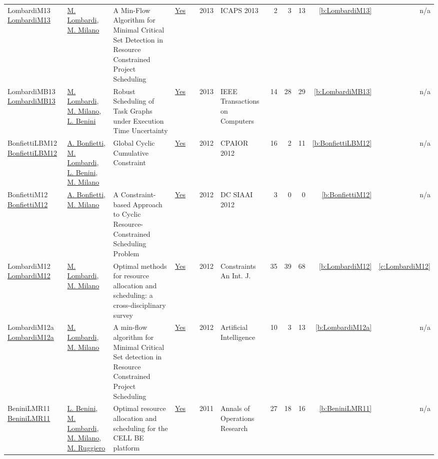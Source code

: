 {\begin{longtable}{>{\raggedright\arraybackslash}p{3cm}>{\raggedright\arraybackslash}p{6cm}>{\raggedright\arraybackslash}p{6.5cm}rrrp{2.5cm}rrrrr}
LombardiM13 \href{http://www.aaai.org/ocs/index.php/ICAPS/ICAPS13/paper/view/6052}{LombardiM13} & \hyperref[auth:a143]{M. Lombardi}, \hyperref[auth:a144]{M. Milano} & A Min-Flow Algorithm for Minimal Critical Set Detection in Resource Constrained Project Scheduling & \href{../works/LombardiM13.pdf}{Yes} & \cite{LombardiM13} & 2013 & ICAPS 2013 & 2 & 3 & 13 & \ref{b:LombardiM13} & n/a\\
LombardiMB13 \href{http://dx.doi.org/10.1109/tc.2011.203}{LombardiMB13} & \hyperref[auth:a143]{M. Lombardi}, \hyperref[auth:a144]{M. Milano}, \hyperref[auth:a247]{L. Benini} & Robust Scheduling of Task Graphs under Execution Time Uncertainty & \href{../works/LombardiMB13.pdf}{Yes} & \cite{LombardiMB13} & 2013 & IEEE Transactions on Computers & 14 & 28 & 29 & \ref{b:LombardiMB13} & n/a\\
BonfiettiLBM12 \href{https://doi.org/10.1007/978-3-642-29828-8_6}{BonfiettiLBM12} & \hyperref[auth:a203]{A. Bonfietti}, \hyperref[auth:a143]{M. Lombardi}, \hyperref[auth:a247]{L. Benini}, \hyperref[auth:a144]{M. Milano} & Global Cyclic Cumulative Constraint & \href{../works/BonfiettiLBM12.pdf}{Yes} & \cite{BonfiettiLBM12} & 2012 & CPAIOR 2012 & 16 & 2 & 11 & \ref{b:BonfiettiLBM12} & n/a\\
BonfiettiM12 \href{https://ceur-ws.org/Vol-926/paper2.pdf}{BonfiettiM12} & \hyperref[auth:a203]{A. Bonfietti}, \hyperref[auth:a144]{M. Milano} & A Constraint-based Approach to Cyclic Resource-Constrained Scheduling Problem & \href{../works/BonfiettiM12.pdf}{Yes} & \cite{BonfiettiM12} & 2012 & DC SIAAI 2012 & 3 & 0 & 0 & \ref{b:BonfiettiM12} & n/a\\
LombardiM12 \href{https://doi.org/10.1007/s10601-011-9115-6}{LombardiM12} & \hyperref[auth:a143]{M. Lombardi}, \hyperref[auth:a144]{M. Milano} & Optimal methods for resource allocation and scheduling: a cross-disciplinary survey & \href{../works/LombardiM12.pdf}{Yes} & \cite{LombardiM12} & 2012 & Constraints An Int. J. & 35 & 39 & 68 & \ref{b:LombardiM12} & \ref{c:LombardiM12}\\
LombardiM12a \href{https://doi.org/10.1016/j.artint.2011.12.001}{LombardiM12a} & \hyperref[auth:a143]{M. Lombardi}, \hyperref[auth:a144]{M. Milano} & A min-flow algorithm for Minimal Critical Set detection in Resource Constrained Project Scheduling & \href{../works/LombardiM12a.pdf}{Yes} & \cite{LombardiM12a} & 2012 & Artificial Intelligence & 10 & 3 & 13 & \ref{b:LombardiM12a} & n/a\\
BeniniLMR11 \href{https://doi.org/10.1007/s10479-010-0718-x}{BeniniLMR11} & \hyperref[auth:a247]{L. Benini}, \hyperref[auth:a143]{M. Lombardi}, \hyperref[auth:a144]{M. Milano}, \hyperref[auth:a724]{M. Ruggiero} & Optimal resource allocation and scheduling for the {CELL} {BE} platform & \href{../works/BeniniLMR11.pdf}{Yes} & \cite{BeniniLMR11} & 2011 & Annals of Operations Research & 27 & 18 & 16 & \ref{b:BeniniLMR11} & n/a\\

\end{longtable}}
